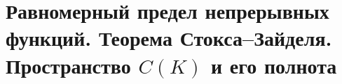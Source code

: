 \section{Равномерный предел непрерывных функций. Теорема Стокса–Зайделя. Пространство $C(K)$ и его полнота}
